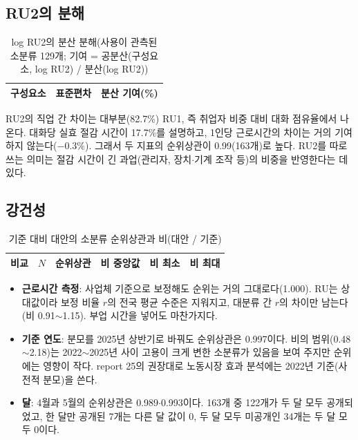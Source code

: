 \documentclass[11pt]{article}
\begin{document}
\subsection{RU2의 분해}

\begin{longtable}{L{7.2cm}R{2.2cm}R{3.0cm}}
\caption{log RU2의 분산 분해(사용이 관측된 소분류 129개; 기여 = 공분산(구성요소, log RU2) / 분산(log RU2))}\label{tab:decomp}\\
\toprule
구성요소 & 표준편차 & 분산 기여(\%) \\
\midrule

\bottomrule
\end{longtable}

\noindent RU2의 직업 간 차이는 대부분(82.7\%) RU1, 즉 취업자 비중 대비 대화 점유율에서 나온다. 대화당 실효 절감 시간이 17.7\%를 설명하고, 1인당 근로시간의 차이는 거의 기여하지 않는다($-0.3$\%). 그래서 두 지표의 순위상관이 0.99(163개)로 높다. RU2를 따로 쓰는 의미는 절감 시간이 긴 과업(관리자, 장치$\cdot$기계 조작 등)의 비중을 반영한다는 데 있다.

\subsection{강건성}

\begin{longtable}{L{6.2cm}R{1.2cm}R{1.8cm}R{1.8cm}R{1.6cm}R{1.6cm}}
\caption{기준 대비 대안의 소분류 순위상관과 비(대안 / 기준)}\label{tab:robust}\\
\toprule
비교 & $N$ & 순위상관 & 비 중앙값 & 비 최소 & 비 최대 \\
\midrule

\bottomrule
\end{longtable}

\begin{itemize}[leftmargin=*]
  \item \textbf{근로시간 측정}: 사업체 기준으로 보정해도 순위는 거의 그대로다(1.000). RU는 상대값이라 보정 비율 $r$의 전국 평균 수준은 지워지고, 대분류 간 $r$의 차이만 남는다(비 0.91$\sim$1.15). 부업 시간을 넣어도 마찬가지다.
  \item \textbf{기준 연도}: 분모를 2025년 상반기로 바꿔도 순위상관은 0.997이다. 비의 범위(0.48$\sim$2.18)는 2022$\sim$2025년 사이 고용이 크게 변한 소분류가 있음을 보여 주지만 순위에는 영향이 작다. report 25의 권장대로 노동시장 효과 분석에는 2022년 기준(사전적 분모)을 쓴다.
  \item \textbf{달}: 4월과 5월의 순위상관은 0.989$\cdot$0.993이다. 163개 중 122개가 두 달 모두 공개되었고, 한 달만 공개된 7개는 다른 달 값이 0, 두 달 모두 미공개인 34개는 두 달 모두 0이다.
\end{itemize}
\end{document}
